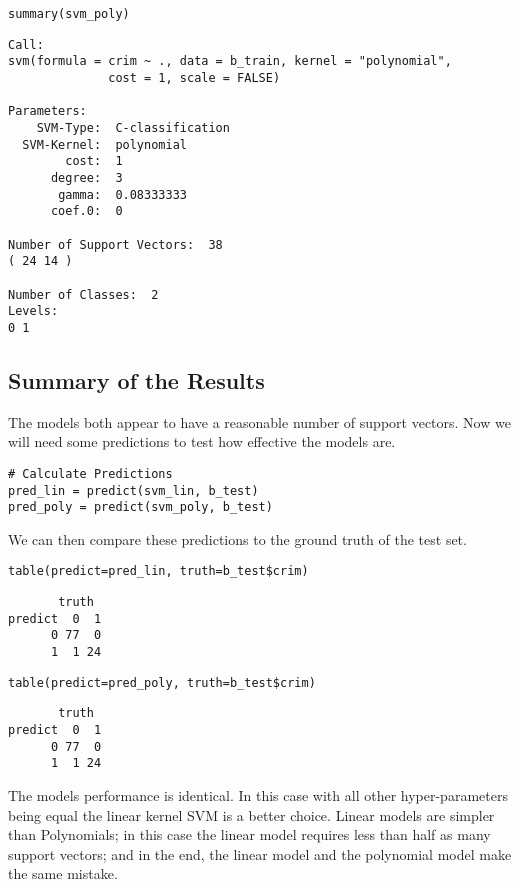 \documentclass[a4paper,man,natbib]{apa6}
\begin{document}
\begin{verbatim}
summary(svm_poly)
\end{verbatim}

\vspace{-0.5em}

\begin{verbatim}
Call:
svm(formula = crim ~ ., data = b_train, kernel = "polynomial", 
              cost = 1, scale = FALSE)

Parameters:
    SVM-Type:  C-classification 
  SVM-Kernel:  polynomial 
        cost:  1 
      degree:  3 
       gamma:  0.08333333 
      coef.0:  0 

Number of Support Vectors:  38
( 24 14 )

Number of Classes:  2 
Levels: 
0 1
\end{verbatim}

\subsection{Summary of the Results}

The models both appear to have a reasonable number of support vectors.
Now we will need some predictions to test how effective the models are.

\begin{verbatim}
# Calculate Predictions
pred_lin = predict(svm_lin, b_test)
pred_poly = predict(svm_poly, b_test)
\end{verbatim}

We can then compare these predictions to the ground truth of the test set.

\begin{verbatim}
table(predict=pred_lin, truth=b_test$crim)
\end{verbatim}

\begin{verbatim}
       truth
predict  0  1
      0 77  0
      1  1 24
\end{verbatim}

\begin{verbatim}
table(predict=pred_poly, truth=b_test$crim)
\end{verbatim}

\begin{verbatim}
       truth
predict  0  1
      0 77  0
      1  1 24
\end{verbatim}

The models performance is identical. In this case with all other hyper-parameters being equal the linear kernel SVM is a better choice. Linear models are simpler than Polynomials; in this case the linear model requires less than half as many support vectors; and in the end, the linear model and the polynomial model make the same mistake.
\end{document}
